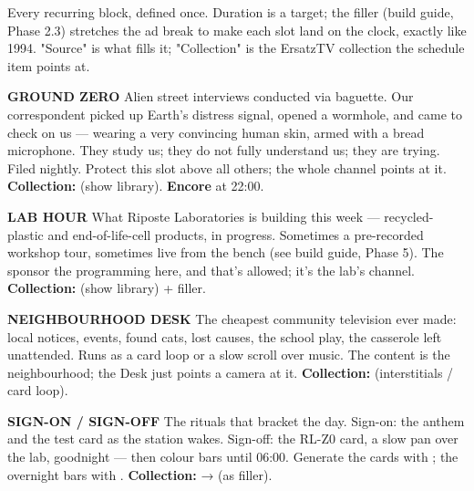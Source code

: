 \documentclass[fontpath=fonts/,logopath=logo/]{riposte-doc}
\begin{document}

Every recurring block, defined once. Duration is a target; the \textbf{} filler (build guide, Phase 2.3) stretches the ad break to make each slot land on the clock, exactly like 1994. "Source" is what fills it; "Collection" is the ErsatzTV collection the schedule item points at.



\begin{ripbullets}
\item \textbf{GROUND ZERO}  Alien street interviews conducted via baguette. Our correspondent picked up Earth's distress signal, opened a wormhole, and came to check on us — wearing a very convincing human skin, armed with a bread microphone. They study us; they do not fully understand us; they are trying. Filed nightly.  Protect this slot above all others; the whole channel points at it. \textbf{Collection:}  (show library). \textbf{Encore} at 22:00.
\item \textbf{LAB HOUR}  What Riposte Laboratories is building this week — recycled-plastic and end-of-life-cell products, in progress. Sometimes a pre-recorded workshop tour, sometimes live from the bench (see build guide, Phase 5). The sponsor  the programming here, and that's allowed; it's the lab's channel. \textbf{Collection:}  (show library) +  filler.
\item \textbf{NEIGHBOURHOOD DESK}  The cheapest community television ever made: local notices, events, found cats, lost causes, the school play, the casserole left unattended. Runs as a card loop or a slow scroll over music. The content is the neighbourhood; the Desk just points a camera at it.  \textbf{Collection:}  (interstitials / card loop).
\item \textbf{SIGN-ON / SIGN-OFF}  The rituals that bracket the day. Sign-on: the anthem and the test card as the station wakes. Sign-off: the RL-Z0 card, a slow pan over the lab, goodnight — then colour bars until 06:00. Generate the cards with ; the overnight bars with . \textbf{Collection:}  →  (as  filler).
\end{ripbullets}
\end{document}
